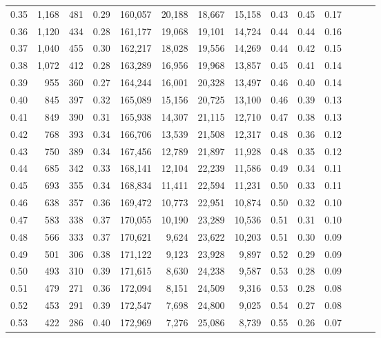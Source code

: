 \begin{tabular}{rrrrrrrrrrrrrr}
0.35 &   1,168 &  481 &  0.29 &  160,057 &   20,188 &  18,667 &  15,158 &  0.43 &  0.45 &      0.17 \\
0.36 &   1,120 &  434 &  0.28 &  161,177 &   19,068 &  19,101 &  14,724 &  0.44 &  0.44 &      0.16 \\
0.37 &   1,040 &  455 &  0.30 &  162,217 &   18,028 &  19,556 &  14,269 &  0.44 &  0.42 &      0.15 \\
0.38 &   1,072 &  412 &  0.28 &  163,289 &   16,956 &  19,968 &  13,857 &  0.45 &  0.41 &      0.14 \\
0.39 &     955 &  360 &  0.27 &  164,244 &   16,001 &  20,328 &  13,497 &  0.46 &  0.40 &      0.14 \\
0.40 &     845 &  397 &  0.32 &  165,089 &   15,156 &  20,725 &  13,100 &  0.46 &  0.39 &      0.13 \\
0.41 &     849 &  390 &  0.31 &  165,938 &   14,307 &  21,115 &  12,710 &  0.47 &  0.38 &      0.13 \\
0.42 &     768 &  393 &  0.34 &  166,706 &   13,539 &  21,508 &  12,317 &  0.48 &  0.36 &      0.12 \\
0.43 &     750 &  389 &  0.34 &  167,456 &   12,789 &  21,897 &  11,928 &  0.48 &  0.35 &      0.12 \\
0.44 &     685 &  342 &  0.33 &  168,141 &   12,104 &  22,239 &  11,586 &  0.49 &  0.34 &      0.11 \\
0.45 &     693 &  355 &  0.34 &  168,834 &   11,411 &  22,594 &  11,231 &  0.50 &  0.33 &      0.11 \\
0.46 &     638 &  357 &  0.36 &  169,472 &   10,773 &  22,951 &  10,874 &  0.50 &  0.32 &      0.10 \\
0.47 &     583 &  338 &  0.37 &  170,055 &   10,190 &  23,289 &  10,536 &  0.51 &  0.31 &      0.10 \\
0.48 &     566 &  333 &  0.37 &  170,621 &    9,624 &  23,622 &  10,203 &  0.51 &  0.30 &      0.09 \\
0.49 &     501 &  306 &  0.38 &  171,122 &    9,123 &  23,928 &   9,897 &  0.52 &  0.29 &      0.09 \\
0.50 &     493 &  310 &  0.39 &  171,615 &    8,630 &  24,238 &   9,587 &  0.53 &  0.28 &      0.09 \\
0.51 &     479 &  271 &  0.36 &  172,094 &    8,151 &  24,509 &   9,316 &  0.53 &  0.28 &      0.08 \\
0.52 &     453 &  291 &  0.39 &  172,547 &    7,698 &  24,800 &   9,025 &  0.54 &  0.27 &      0.08 \\
0.53 &     422 &  286 &  0.40 &  172,969 &    7,276 &  25,086 &   8,739 &  0.55 &  0.26 &      0.07 \\

\end{tabular}
